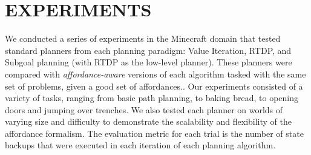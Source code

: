 \documentclass[]{article}
\newcommand{\stnote}[1]{\textcolor{Blue}{\textbf{ST: #1}}}
\newcommand{\jmnote}[1]{\textcolor{Green}{\textbf{JM: #1}}}
\begin{document}




\section{EXPERIMENTS}

%


We conducted a series of experiments in the Minecraft domain that
tested standard planners from each planning paradigm:
Value Iteration, RTDP, and Subgoal planning (with RTDP as the low-level
planner). These planners were compared with {\it affordance-aware}
versions of each algorithm tasked with the same set of problems, given a good set of affordances.. Our experiments consisted
of a variety of tasks, ranging from basic path planning, to baking bread, to opening doors 
and jumping over trenches.  We also tested each planner on worlds 
of varying size and difficulty to demonstrate the scalability and flexibility of the affordance
formalism. The evaluation metric for each trial is the number of state backups that were 
executed in each iteration of each planning algorithm.
\end{document}
